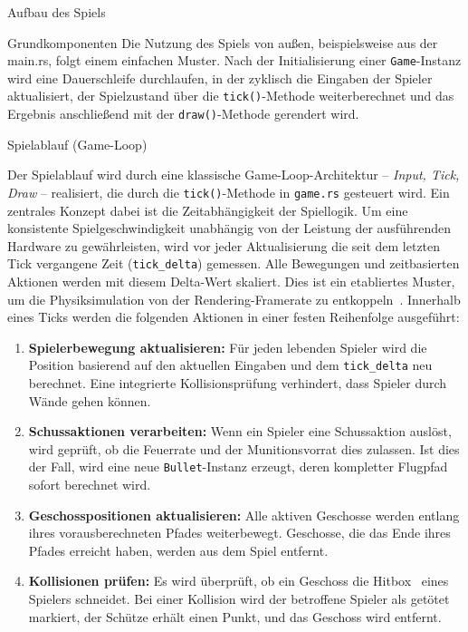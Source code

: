 \begin{section}{Aufbau des Spiels}
\begin{subsection}{Grundkomponenten}
Die Nutzung des Spiels von außen, beispielsweise aus der main.rs, folgt einem einfachen Muster.
Nach der Initialisierung einer \texttt{Game}-Instanz wird eine Dauerschleife durchlaufen, in der zyklisch die Eingaben der Spieler aktualisiert, der Spielzustand über die \texttt{tick()}-Methode weiterberechnet und das Ergebnis anschließend mit der \texttt{draw()}-Methode gerendert wird.
\end{subsection}

\begin{subsection}{Spielablauf (Game-Loop)}

Der Spielablauf wird durch eine klassische Game-Loop-Architektur -- \emph{Input, Tick, Draw} -- realisiert, die durch die \texttt{tick()}-Methode in \texttt{game.rs} gesteuert wird.
Ein zentrales Konzept dabei ist die Zeitabhängigkeit der Spiellogik.
Um eine konsistente Spielgeschwindigkeit unabhängig von der Leistung der ausführenden Hardware zu gewährleisten, wird vor jeder Aktualisierung die seit dem letzten Tick vergangene Zeit (\texttt{tick\_delta}) gemessen.
Alle Bewegungen und zeitbasierten Aktionen werden mit diesem Delta-Wert skaliert. Dies ist ein etabliertes Muster, um die Physiksimulation von der Rendering-Framerate zu entkoppeln~\cite{fiedler2004fix}.
Innerhalb eines Ticks werden die folgenden Aktionen in einer festen Reihenfolge ausgeführt:
\begin{enumerate}
    \item \textbf{Spielerbewegung aktualisieren:} Für jeden lebenden Spieler wird die Position basierend auf den aktuellen Eingaben und dem \texttt{tick\_delta} neu berechnet.
Eine integrierte Kollisionsprüfung verhindert, dass Spieler durch Wände gehen können.
    \item \textbf{Schussaktionen verarbeiten:} Wenn ein Spieler eine Schussaktion auslöst, wird geprüft, ob die Feuerrate und der Munitionsvorrat dies zulassen.
Ist dies der Fall, wird eine neue \texttt{Bullet}-Instanz erzeugt, deren kompletter Flugpfad sofort berechnet wird.
    \item \textbf{Geschosspositionen aktualisieren:} Alle aktiven Geschosse werden entlang ihres vorausberechneten Pfades weiterbewegt.
Geschosse, die das Ende ihres Pfades erreicht haben, werden aus dem Spiel entfernt.
    \item \textbf{Kollisionen prüfen:} Es wird überprüft, ob ein Geschoss die Hitbox~\cite{infil_glossary_hitbox} eines Spielers schneidet.
Bei einer Kollision wird der betroffene Spieler als getötet markiert, der Schütze erhält einen Punkt, und das Geschoss wird entfernt.

\end{enumerate}
\end{subsection}
\end{section}
